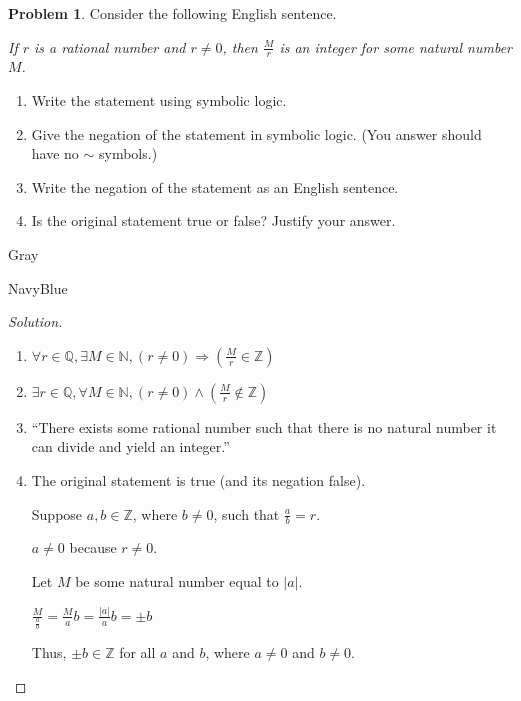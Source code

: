 \documentclass[12pt]{amsart}
\newcounter{problem_number}[section]
\theoremstyle{named}
\newenvironment{soln}
{\begin{color}{Gray}\begin{framed}\begin{color}{NavyBlue}\begin{proof}[Solution]
\doublespacing}
{\end{proof}\end{color}\end{framed}\end{color}}
\theoremstyle{definition}
\newtheorem{problem}{Problem}
\begin{document}
\begin{problem}
	Consider the following English sentence.
\begin{center}
	\emph{If $r$ is a rational number and $r\not=0$, then $\frac{M}{r}$ is an integer for some natural number $M$.}
\end{center}

	\begin{enumerate}
		\item Write the statement using symbolic logic.
		\item Give the negation of the statement in symbolic logic. (You answer should have no $\sim$ symbols.)
		\item Write the negation of the statement as an English sentence.
		\item Is the original statement true or false? Justify your answer.
	\end{enumerate}
\end{problem}

\begin{soln}
	\phantom{ }
	\begin{enumerate}
		\item $\forall r \in \mathbb Q,\exists M \in \mathbb N,
		(r \neq 0) \Rightarrow  (\frac{M}{r} \in \mathbb Z)$

		\item $\exists r \in \mathbb Q, \forall M \in \mathbb N, (r \neq 0)
		\land (\frac{M}{r} \notin \mathbb Z)$

		\item ``There exists some rational number such that there is no natural number
		it can divide and yield an integer.''

		\item The original statement is true (and its negation false). 
		
		
		

		\noindent Suppose $a,b \in \mathbb Z$, where $b \neq 0$, such that $\frac{a}{b} = r$.

		\noindent $a \neq 0$ because $r \neq 0$.

		\noindent Let $M$ be some natural number equal to $|a|$.
		
		\noindent $\frac{M}{\frac{a}{b}} = \frac{M}{a}b = \frac{|a|}{a}b = \pm b$

		\noindent Thus, $\pm b \in \mathbb Z$ for all $a$ and $b$, where $a \neq 0$
		and $b \neq 0$. 
	\end{enumerate}
\end{soln}


\end{document}
